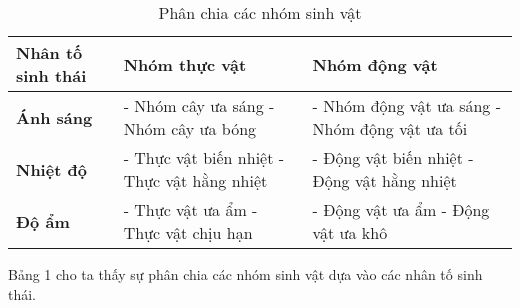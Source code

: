 \documentclass[12pt, a4paper]{article}
\begin{document}

\begin{table}[h]
    \renewcommand{\arraystretch}{3}
    \begin{tabular}{||m{5cm}|m{5cm}|m{5cm}||}
    \hline
    \textbf{Nhân tố sinh thái} & \textbf{Nhóm thực vật} & \textbf{Nhóm động vật} \\
    \hline \hline
    \textbf{Ánh sáng} &
    - Nhóm cây ưa sáng \newline - Nhóm cây ưa bóng &
    - Nhóm động vật ưa sáng \newline - Nhóm động vật ưa tối \\
    \hline
    \textbf{Nhiệt độ} &
    - Thực vật biến nhiệt \newline - Thực vật hằng nhiệt &
    - Động vật biến nhiệt \newline - Động vật hằng nhiệt \\
    \hline
    \textbf{Độ ẩm} &
    - Thực vật ưa ẩm \newline - Thực vật chịu hạn &
    - Động vật ưa ẩm \newline - Động vật ưa khô \\
    \hline
    \end{tabular}
    \caption{Phân chia các nhóm sinh vật}
\end{table}
Bảng 1 cho ta thấy sự phân chia các nhóm sinh vật dựa vào các nhân tố sinh thái.
\end{document}
